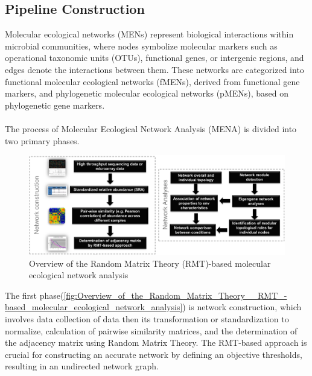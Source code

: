 \subsection{Pipeline Construction}\label{subsec:pipeline-construction}

Molecular ecological networks (MENs) represent biological interactions within microbial communities, where nodes symbolize molecular markers such as operational taxonomic units (OTUs), functional genes, or intergenic regions, and edges denote the interactions between them.
These networks are categorized into functional molecular ecological networks (fMENs), derived from functional gene markers, and phylogenetic molecular ecological networks (pMENs), based on phylogenetic gene markers.
\\\\
\noindent The process of Molecular Ecological Network Analysis (MENA) is divided into two primary phases.

\begin{figure}[H]
    \centering
    \includegraphics[width=1\textwidth]{Overview_of_the_Random_Matrix_Theory__RMT_-based_molecular_ecological_network_analysis_horizontal} %
    \caption{Overview of the Random Matrix Theory (RMT)-based molecular ecological network analysis\cite{deng_molecular_2012}}
    \label{fig:Overview_of_the_Random_Matrix_Theory__RMT_-based_molecular_ecological_network_analysis}
\end{figure}

The first phase(\autoref{fig:Overview_of_the_Random_Matrix_Theory__RMT_-based_molecular_ecological_network_analysis}) is network construction, which involves data collection of data then its transformation or standardization to normalize, calculation of pairwise similarity matrices, and the determination of the adjacency matrix using Random Matrix Theory.
The RMT-based approach is crucial for constructing an accurate network by defining an objective thresholds, resulting in an undirected network graph.

